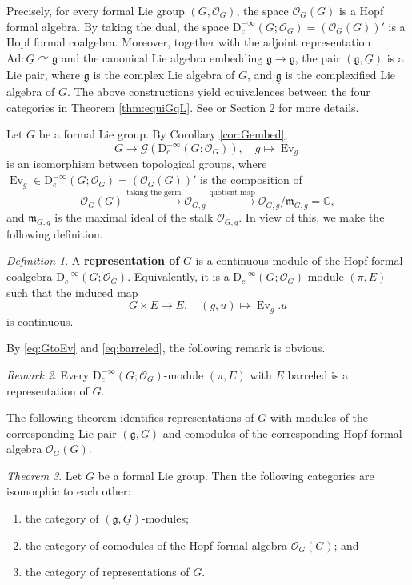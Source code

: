 \documentclass[12pt, a4paper]{amsart}
\newcommand{\BC}{{\mathbb {C}}}
\newcommand{\CG}{{\mathcal {G}}}
\newcommand{\CO}{{\mathcal {O}}}
\newcommand{\RD}{{\mathrm {D}}}
\newcommand{\Ev}{\operatorname{Ev}}
\newcommand{\g}{\mathfrak g}
\newcommand{\m}{\mathfrak m}
\newcommand{\be}{\begin {equation}}
\newcommand{\ee}{\end {equation}}
\theoremstyle{Theorem}
\theoremstyle{Theorem}
\theoremstyle{Theorem}
\theoremstyle{Theorem}
\theoremstyle{Plain}
\theoremstyle{remark}
\theoremstyle{remark}
\theoremstyle{Definition}
\newtheorem{dfn}{Definition}[section]
\newtheorem{thmd}[dfn]{Theorem}
\newtheorem{remarkd}[dfn]{Remark}
\numberwithin{equation}{section}
\begin{document}
Precisely, for every formal Lie group $(G,\CO_G)$, the space $\CO_G(G)$ is a Hopf formal algebra. By taking the dual, the space $\RD_c^{-\infty}(G;\CO_G)=(\CO_G(G))'$ is a Hopf formal coalgebra.
Moreover, together with the adjoint representation $\mathrm{Ad}:\underline G  \curvearrowright \g$ and the canonical Lie algebra embedding $\underline{\g}\rightarrow \g$,  the pair $(\g,\underline{G})$ is a Lie pair, where $\mathfrak{g}$ is the complex Lie algebra of $G$, and $\underline{\mathfrak{g}}$ is the complexified  Lie algebra of $\underline{G}$. The above constructions yield equivalences between the four categories in Theorem \ref{thm:equiGqL}. See \cite{CSW4} or  Section 2 for more details. 
% 

Let $G$ be a formal Lie group. By Corollary \ref{cor:Gembed},
\be\label{eq:GtoEv} G\rightarrow \CG(\RD_c^{-\infty}(G;\CO_G)),\quad g\mapsto \Ev_g\ee is an isomorphism between topological groups, where $\Ev_g\in \RD_c^{-\infty}(G;\CO_G)=(\CO_G(G))'$ is the composition of 
\be\label{evg}
\CO_G(G)\xrightarrow{\textrm{taking the germ}} \CO_{G,g}\xrightarrow{\textrm{quotient map}} \CO_{G,g}/\m_{G,g}=\BC, \ee 
and $\m_{G,g}$ is the maximal ideal of the  stalk $\CO_{G,g}$. 
In view of this, we make the following definition. 
\begin{dfn}
A \textbf{representation of } $G$ is a continuous module of the Hopf formal coalgebra $\RD_c^{-\infty}(G;\CO_G)$. Equivalently, it is a $\RD_c^{-\infty}(G;\CO_G)$-module $(\pi,E)$ such that the induced map 
\[G\times E\rightarrow E,\quad (g,u)\mapsto\Ev_g.u\]
is continuous. \end{dfn}

By \eqref{eq:GtoEv} and \eqref{eq:barreled}, the following remark is obvious. \begin{remarkd}Every $\RD_c^{-\infty}(G;\CO_G)$-module $(\pi,E)$ with $E$ barreled is a representation of $G$.
\end{remarkd}


The following theorem identifies representations of $G$ with modules of the corresponding Lie pair $(\g,\underline{G})$ and comodules of the corresponding Hopf formal algebra $\CO_G(G)$.


\begin{thmd}\label{thm:eqMR}
Let $G$ be a formal Lie group. Then the following categories are isomorphic to each other:
\begin{enumerate}
    \item the category of $(\mathfrak{g},\underline{G})$-modules;
    \item the category of comodules of the Hopf formal algebra $\CO_G(G)$; and
    \item the category of representations of $G$.
\end{enumerate}
\end{thmd}
\end{document}
